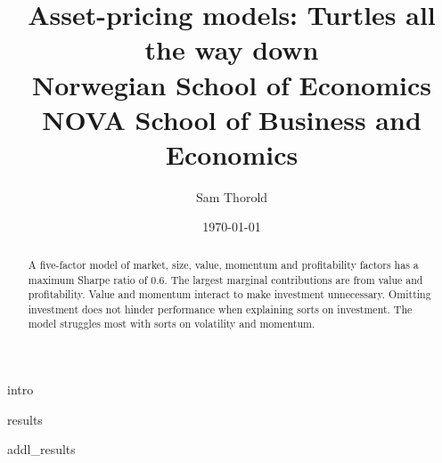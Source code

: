 \documentclass[a4paper, 12pt]{article}
\title{
  {Asset-pricing models: Turtles all the way down}\\
  {\large Norwegian School of Economics}\\
  {\large NOVA School of Business and Economics}
}
\author{Sam Thorold}
\date{\today}
\begin{document}
\maketitle

\begin{abstract}
  A five-factor model of
  market, size, value, momentum and profitability factors
  has a maximum Sharpe ratio of 0.6.
  The largest marginal contributions are from value and profitability.
  Value and momentum interact to make investment unnecessary.
  Omitting investment does not hinder performance when explaining sorts on investment.
  The model struggles most with sorts on volatility and momentum.
\end{abstract}

{intro}




{results}


\printbibliography

\appendix

{addl_results}


\end{document}
